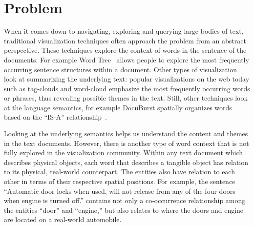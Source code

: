 

\section{Problem}
When it comes down to navigating, exploring and querying large bodies of text,
traditional visualization techniques often approach the problem from an abstract
perspective. These techniques explore the context of words in the sentence of
the documents. For example Word Tree~\cite{Wattenberg2008} allows people to
explore the most frequently occurring sentence structures within a document.
Other types of visualization look at summarizing the underlying text: popular 
visualizations on the web today such as tag-clouds and word-cloud emphasize
the most frequently occurring words or phrases, thus revealing possible themes in
the text. Still, other techniques look at the language semantics, for example 
DocuBurst spatially organizes words based on the ``IS-A''
relationship~\cite{COL2009a}.

Looking at the underlying semantics helps us understand the content and 
themes in the text documents. However, there is another type of word context 
that is not fully explored in the visualization community. Within any text 
document which describes physical objects, each word that describes a 
tangible object has relation to its physical, real-world counterpart. The 
entities also have relation to each other in terms of their respective 
spatial positions. For example, the sentence ``Automatic door locks when 
used, will not release from any of the four doors when engine is turned off.'' 
contains not only a co-occurrence relationship among the entities ``door'' and 
``engine,'' but also relates to where the doors and engine are located on a 
real-world automobile.



